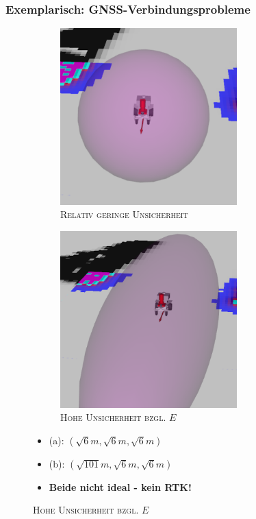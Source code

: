 \documentclass{beamer}
\begin{document}
\begin{frame}
  \frametitle{Exemplarisch: GNSS-Verbindungsprobleme}
  \begin{figure}[H]
    \centering
    \begin{subfigure}[b]{0.49\textwidth}
        \centering
        \includegraphics[width=0.75\textwidth]{img/GNSS_cov_low.png}
        \caption{\textsc{Relativ geringe Unsicherheit}}
    \end{subfigure}
    \hfill
    \begin{subfigure}[b]{0.49\textwidth}
        \centering
        \includegraphics[width=0.75\textwidth]{img/GNSS_cov_high.png}
        \caption{\textsc{Hohe Unsicherheit bzgl.} $E$}
    \end{subfigure}
    \begin{itemize}
      \item (a): $(\sqrt{6}m, \sqrt{6}m, \sqrt{6}m)$
      \item (b): $(\sqrt{101}m, \sqrt{6}m, \sqrt{6}m)$
      \item \textbf{Beide nicht ideal - kein RTK!}
    \end{itemize}
  \end{figure}
\end{frame}
\end{document}
